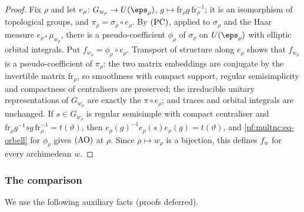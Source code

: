 \begin{proof}
Fix $\rho$ and let $e_\rho\colon G_{w_\rho}\to U(\eps_\rho)$, $g\mapsto\mathrm{fr}_\rho g\,\mathrm{fr}_\rho^{-1}$; it is an
isomorphism of topological groups, and $\pi_\rho=\sigma_\rho\circ e_\rho$. By $\textup{(PC)}$, applied to $\sigma_\rho$
and the Haar measure $e_{\rho*}\mu_{w_\rho}$, there is a pseudo-coefficient $\phi_\rho$ of $\sigma_\rho$ on $U(\eps_\rho)$
with elliptic orbital integrals. Put $f_{w_\rho}=\phi_\rho\circ e_\rho$. Transport of structure along $e_\rho$ shows that
$f_{w_\rho}$ is a pseudo-coefficient of $\pi_\rho$: the two matrix embeddings are conjugate by the invertible matrix
$\mathrm{fr}_\rho$, so smoothness with compact support, regular semisimplicity and compactness of centralisers are
preserved; the irreducible unitary representations of $G_{w_\rho}$ are exactly the $\pi\circ e_\rho$; and traces and orbital
integrals are unchanged. If $s\in G_{w_\rho}$ is regular semisimple with compact centraliser and
$\mathrm{fr}_\rho g^{-1}sg\,\mathrm{fr}_\rho^{-1}=t(\vartheta)$, then $e_\rho(g)^{-1}e_\rho(s)e_\rho(g)=t(\vartheta)$, and
\eqref{pf:multnc:eq-orbell} for $\phi_\rho$ gives $\textup{(AO)}$ at $\rho$. Since $\rho\mapsto w_\rho$ is a bijection,
this defines $f_w$ for every archimedean $w$.
\end{proof}

\subsubsection*{The comparison}

We use the following auxiliary facts (proofs deferred).

